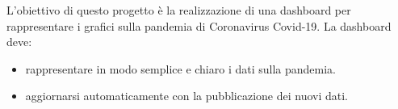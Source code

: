 
L’obiettivo di questo progetto è la realizzazione di una dashboard per rappresentare i grafici sulla pandemia di Coronavirus Covid-19.
\newline
La dashboard deve:
\hfill
\newline
\begin{itemize}
    \item rappresentare in modo semplice e chiaro i dati sulla pandemia.
    \item aggiornarsi automaticamente con la pubblicazione dei nuovi dati.
\end{itemize}
